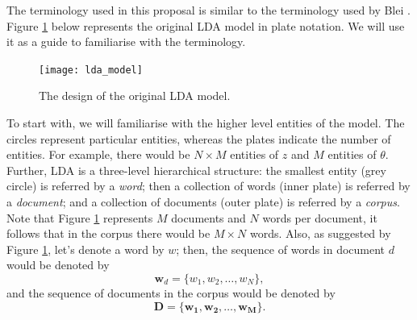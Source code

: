 \documentclass{mprop}
\begin{document}
\par The terminology used in this proposal is similar to the terminology used by Blei \cite{blei_2012}. Figure \ref{fig:lda} below represents the original LDA model in plate notation. We will use it as a guide to familiarise with the terminology.   
\begin{figure}[H]
  \centering
  \texttt{[image: lda\_model]}
  \caption{The design of the original LDA model.}
  \label{fig:lda}
\end{figure}

\par To start with, we will familiarise with the higher level entities of the model. The circles represent particular entities, whereas the plates indicate the number of entities. For example, there would be $N \times M$ entities of $z$ and $M$ entities of $\theta$. Further, LDA is a three-level hierarchical structure: the smallest entity (grey circle) is referred by a \textit{word}; then a collection of words (inner plate) is referred by a \textit{document}; and a collection of documents (outer plate) is referred by a \textit{corpus}. Note that Figure \ref{fig:lda} represents $M$ documents and $N$ words per document, it follows that in the corpus there would be $M \times N$ words. Also, as suggested by Figure \ref{fig:lda}, let's denote a word by $w$; then, the sequence of words in document $d$ would be denoted by 
\begin{equation*}
\mathbf{w}_d = \{w_1, w_2, \dots, w_N\},
\end{equation*}
and the sequence of documents in the corpus would be denoted by
\begin{equation*}
\mathcal{\mathbf{D}} = \{\mathbf{w_1}, \mathbf{w_2}, \dots, \mathbf{w_M}\}.
\end{equation*}
 
\end{document}

